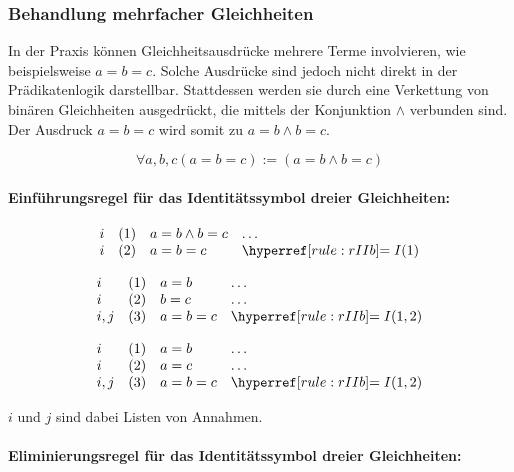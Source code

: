 \documentclass[main.tex]{subfiles}
\begin{document}
\subsubsection{Behandlung mehrfacher Gleichheiten}
In der Praxis können Gleichheitsausdrücke mehrere Terme involvieren, wie beispielsweise \(a = b = c\). Solche Ausdrücke sind jedoch nicht direkt in der Prädikatenlogik darstellbar. Stattdessen werden sie durch eine Verkettung von binären Gleichheiten ausgedrückt, die mittels der Konjunktion \(\land\) verbunden sind. Der Ausdruck \(a = b = c\) wird somit zu \(a = b \land b = c\).

\begin{definition}
\[
\forall a, b, c \left( a = b = c \right) := \left( a = b \land b = c \right)
\]
\end{definition}

\paragraph{Einführungsregel für das Identitätssymbol dreier Gleichheiten:}
\label{rule:rIIb}

\[
\begin{array}{llll}
	i & (1) & a = b \land b = c & \dots \\
 	i & (2) & a = b = c & \rIIb{1} \\
\end{array}
\]

\[
\begin{array}{llll}
	i & (1) & a = b & \dots \\
        i & (2) & b = c & \dots \\
 	i,j & (3) & a = b = c & \rIIb{1,2} \\
\end{array}
\]

\[
\begin{array}{llll}
	i & (1) & a = b & \dots \\
        i & (2) & a = c & \dots \\
 	i,j & (3) & a = b = c & \rIIb{1,2} \\
\end{array}
\]

\(i\) und \(j\) sind dabei Listen von Annahmen.


\paragraph{Eliminierungsregel für das Identitätssymbol dreier Gleichheiten:}
\label{rule:rIEb}
\end{document}
